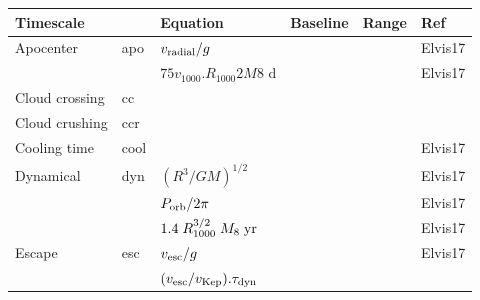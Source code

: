 \documentclass[11pt]{article}
\begin{document}
\newpage


\begin{table}
  \begin{center}
    \begin{tabular}{l l l l l l} 
      \hline
      \hline 
      Timescale     &          & Equation                                                                                                         & Baseline& Range& Ref \\
      \hline  
      \hline 
      Apocenter            & apo     & $v_{\rm radial}/g$                                                                                     &            &             & Elvis17\\
                                  &             &    $75 v_{1000}. R_{1000} 2 M8$ d                                                             & & & Elvis17\\ 
      Cloud crossing    &  cc         &    & & & \\
      Cloud crushing    & ccr       &     & & & \\
      Cooling time       & cool      &    & & & Elvis17\\
      Dynamical            & dyn    & $(R^3/GM)^{1/2}$                                                                                                 &   & & Elvis17\\
                                   &          & $P_{\rm orb}/2\pi$                                                                                                 &   & & Elvis17\\
                                   &           & $1.4 \; R_{1000}^{3/2} \; M_{8} \; {\rm yr}$                                                             &   & & Elvis17\\
      Escape                 &  esc  &  $v_{\rm esc} / g$                                                                                                         & & & Elvis17\\
                                  &          & $(v_{\rm esc} / v_{\rm Kep}) . \tau_{\rm dyn} $       & & & \\

\end{tabular}
\end{center}
\end{table}
\end{document}
